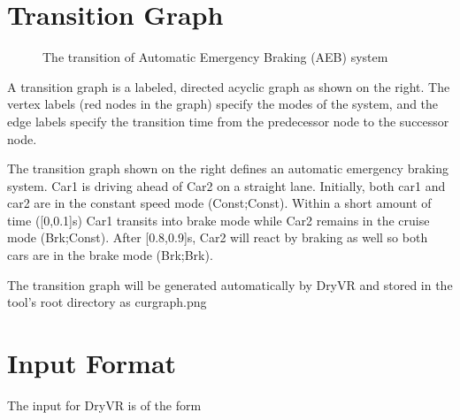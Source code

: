 \documentclass[letterpaper,10pt,english]{sphinxmanual}
\begin{document}
\section{Transition Graph}
\label{\detokenize{dryvr's_language:transition-graph-label}}\label{\detokenize{dryvr's_language:transition-graph}}\begin{wrapfigure}{r}{0pt}
\centering
\noindent{}
\caption{The transition of Automatic Emergency Braking (AEB) system}\label{\detokenize{dryvr's_language:id1}}\end{wrapfigure}

A transition graph is a labeled, directed acyclic graph as shown on the right. The vertex labels (red nodes in the graph) specify the modes of the system, and the edge labels specify the transition time from the predecessor node to the successor node.

The transition graph shown on the right defines an automatic emergency braking system. Car1 is driving ahead of Car2 on a straight lane. Initially, both car1 and car2 are in the constant speed mode (Const;Const). Within a short amount of time ({[}0,0.1{]}s) Car1 transits into brake mode while Car2 remains in the cruise mode (Brk;Const). After {[}0.8,0.9{]}s, Car2 will react by braking as well so both cars are in the brake mode (Brk;Brk).

The transition graph will be generated automatically by DryVR and stored in the tool's root directory as curgraph.png


\section{Input Format}
\label{\detokenize{dryvr's_language:input-format}}\label{\detokenize{dryvr's_language:input-format-label}}
The input for DryVR is of the form
\end{document}
